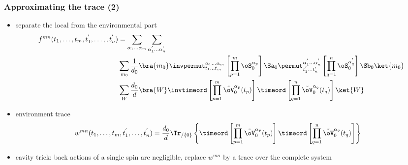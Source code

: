 \begin{frame}
	\frametitle{ Approximating the trace (2) }
    \begin{itemize}
        \item separate the local from the environmental part
        \begin{align*}
        \begin{split}
            f^{mn}(t_1,\dots,t_m,t_1^{'},\dots,,t_n^{'}) &= \sum_{\alpha_1\dots\alpha_m} \sum_{\alpha_1^{'}\dots\alpha_n^{'}} \\
            &\sum_{m_0} \frac1{d_0} \bra{m_0} \invpermut^{\alpha_1\dots\alpha_m}_{t_1\dots t_m} \left[\prod_{p=1}^{m} \oS_0^{\alpha_p} \right]\Sa_0 \permut^{\alpha_1^{'}\dots\alpha_n^{'}}_{t_1^{'} \dots t_n^{'}} \left[\prod_{q=1}^{n} \oS_0^{\alpha_q^{'}} \right] \Sb_0 \ket{m_0} \\
            &\sum_{W} \frac{d_0}{d} \bra{W} \invtimeord \left[\prod_{p=1}^{m} \tilde{\oV}_0^{\alpha_p} (t_p) \right] \timeord \left[ \prod_{q=1}^{n} \tilde{\oV}_0^{\alpha_q} (t_q) \right] \ket{W}
        \end{split}
        \end{align*}
        \item environment trace
        \begin{align*}
            w^{mn}(t_1,\dots,t_m,t_1^{'},\dots,t_n^{'}) &= \frac{d_0}{d} \Tr_{/\{0\}} \left\{ \timeord \left[\prod_{p=1}^{m} \tilde{\oV}_0^{\alpha_p} (t_p) \right] \timeord \left[ \prod_{q=1}^{n} \tilde{\oV}_0^{\alpha_q} (t_q) \right] \right\}
        \end{align*}
        \item cavity trick\slidecite{\georg}: back actions of a single spin are negligible, replace $w^{mn}$ by a trace over the complete system
    \end{itemize}
\end{frame}

